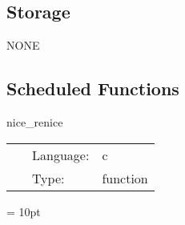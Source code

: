 \documentclass{article}
\begin{document}
\subsection*{Storage}NONE
\subsection*{Scheduled Functions}
\vspace{5mm}


\hspace{5mm} nice\_renice 

\hspace{5mm}{\it renice the process } 


\hspace{5mm}

 \begin{tabular*}{160mm}{cll} 
~ & Language:  & c \\ 
~ & Type:  & function \\ 
\end{tabular*} 



\vspace{5mm}\parskip = 10pt 
\end{document}
